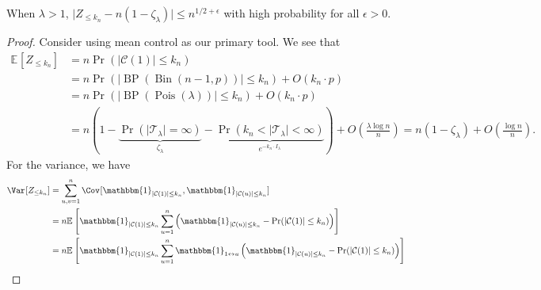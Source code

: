 \begin{lemma}\label{lma:small-component-supercritical-Erdős-Rényi-graph}
	When \(\lambda > 1\), \(\lvert Z_{\leq k_n} - n(1 - \zeta _\lambda ) \rvert \leq n^{1 / 2 + \epsilon }\) with high probability for all \(\epsilon > 0\).
\end{lemma}
\begin{proof}
	Consider using mean control as our primary tool. We see that
	\[
		\begin{split}
			\mathbb{E}_{}[Z_{\leq k_n}]
			 & = n \Pr_{}(\lvert \mathcal{C} (1) \rvert \leq k_n)                                                                                                                                                                                                  \\
			 & = n \Pr_{}(\lvert \operatorname{BP}(\operatorname{Bin}(n-1, p) )  \rvert \leq k_n) + O(k_n \cdot p)                                                                                                                                                 \\
			 & = n \Pr_{}(\lvert \operatorname{BP}(\operatorname{Pois}(\lambda ) )  \rvert \leq k_n) + O(k_n \cdot p)                                                                                                                                              \\
			 & = n ( 1 - \underbrace{\Pr_{}(\lvert \mathcal{T} _\lambda  \rvert = \infty )}_{\zeta _\lambda }  - \underbrace{\Pr_{}(k_n < \lvert \mathcal{T} _\lambda \rvert < \infty )}_{e^{-k_n \cdot I _\lambda }} ) + O\left( \frac{\lambda \log n}{n} \right)
			= n (1 - \zeta _\lambda ) + O\left( \frac{\log n}{n} \right).
		\end{split}
	\]
	For the variance, we have
	\[
		\begin{split}
			\Var_{}[Z_{\leq k_n}]
			 & = \sum_{u, v=1}^{n} \Cov_{}[\mathbbm{1}_{\lvert \mathcal{C} (1) \rvert \leq k_n} , \mathbbm{1}_{\lvert \mathcal{C} (u) \rvert \leq k_n} ]                                                                                                                               \\
			 & = n\mathbb{E}_{}\left[\mathbbm{1}_{\lvert \mathcal{C} (1) \rvert \leq k_n} \sum_{u=1}^{n} \left( \mathbbm{1}_{\lvert \mathcal{C} (u) \rvert \leq k_n} - \Pr_{}(\lvert \mathcal{C} (1) \rvert \leq k_n)  \right)  \right]                                                \\
			 & = n \mathbb{E}_{}\left[\mathbbm{1}_{\lvert \mathcal{C} (1) \rvert \leq k_n} \sum_{u=1}^{n} \mathbbm{1}_{1 \leftrightarrow u} \left( \mathbbm{1}_{\lvert \mathcal{C} (u) \rvert \leq k_n} - \Pr_{}(\lvert \mathcal{C} (1) \rvert \leq k_n)  \right)  \right]             \\

\end{split}\]
\end{proof}
